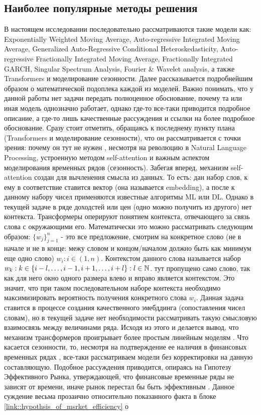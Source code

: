 	\subsection{Наиболее популярные методы решения}
		В настоящем исследовании последовательно рассматриваются такие модели как: Exponentially Weighted Moving Average, Auto-regressive Integrated Moving Average, Generalized Auto-Regressive Conditional Heteroskedasticity, Auto-regressive Fractionally Integrated Moving Average, Fractionally Integrated GARCH, Singular Spectrum Analysis, Fourier \& Wavelet analysis, а также Transformers и моделирование сезонности. Далее рассказывается подробнейшим образом о математической подоплека каждой из моделей. Важно понимать, что у данной работы нет задачи передать полноценное обоснование, почему та или иная модель однозначно работает, однако где-то все-таки приводится подробное описание, а где-то лишь качественные рассуждения и ссылки на более подробное обоснование. Сразу стоит отметить, обращаясь к последнему пункту плана (Transformers и моделирование сезонности), что он рассматривается с точки зрения: почему он тут не нужен \cite{transformers_are_useless_for_TSF}, несмотря на революцию в Natural Language Processing, устроенную методом self-attention \cite{attention_transformers} и важным аспектом моделирования временных рядов (сезонность). Забегая вперед, механизм self-attention создан для вычленения смысла из данных. То есть: дан набор слов, к ему в соответствие ставится вектор (она называется embedding), а после к данному набору чисел применяются известные алгоритмы ML или DL. Однако в текущей задаче в ряде доходстей или цен (одно можно получить из другого) нет контекста. Трансформеры оперируют понятием контекста, отвечающего за связь слова с окружающими его. Математически это можно рассматривать следующим образом: $\{w_j\}_{j=1}^n$ - это все предложение, смотрим на конкретное слово (не в начале и не в конце: межу словом и концом/началом должно быть как минимум еще одно слово) $w_i: i \in (1,n)$. Контекстом данного слова называется набор $w_k: k \in \{i - l, \ldots, i - 1, i + 1, \ldots, i + l\}: l \in \mathbb{N}$. тут пропущено само слово, так как для него окно одного размера влево и вправо является контекстом. Это значит, что при таком последовательном наборе контекста необходимо максимизировать вероятность получения конкретного слова $w_i$. Данная задача ставится в процессе создания качественного эмебддинга (сопоставления чисел словам), но в текущей задаче нет необходимости рассматривать такую смысловую взаимосвязь между величинами ряда. Исходя из этого и делается вывод, что механизм трансформеров проигрывает более простым линейным моделям \cite{transformers_are_useless_for_TSF}. Что касается сезонности, то, несмотря на подтверждение ее наличия в финансовых временных рядах \cite{seasonality_in_financial_TS_is_real}, все-таки рассматриваем модели без корректировки на данную составляющую. Подобное рассуждения приводится, опираясь на Гипотезу Эффективного Рынка, утверждающей, что финансовые временные ряды не зависят от времени, иначе рынок перестал бы быть эффективным \cite{seasonality_test_for_financial_stock_market}. Данное суждение весьма прозаично относительно показанного факта в блоке \ref{link::hypothsis_of_msrket_efficiency} о 